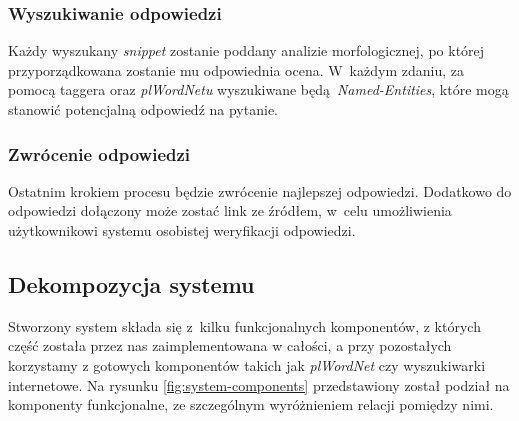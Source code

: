 \subsubsection{Wyszukiwanie odpowiedzi}
Każdy wyszukany \emph{snippet} zostanie poddany analizie morfologicznej, po której przyporządkowana zostanie mu odpowiednia ocena. W~każdym zdaniu, za pomocą taggera oraz \emph{plWordNetu} wyszukiwane będą \emph{Named-Entities}, które mogą stanowić potencjalną odpowiedź na pytanie.

\subsubsection{Zwrócenie odpowiedzi}
Ostatnim krokiem procesu będzie zwrócenie najlepszej odpowiedzi. Dodatkowo do odpowiedzi dołączony może zostać link ze źródłem, w~celu umożliwienia użytkownikowi systemu osobistej weryfikacji odpowiedzi.

\subsection{Dekompozycja systemu}
Stworzony system składa się z~kilku funkcjonalnych komponentów, z których część została przez nas zaimplementowana w całości, a przy pozostałych korzystamy z gotowych komponentów takich jak \emph{plWordNet} czy wyszukiwarki internetowe. Na rysunku \ref{fig:system-components} przedstawiony został podział na komponenty funkcjonalne, ze szczególnym wyróżnieniem relacji pomiędzy nimi.

